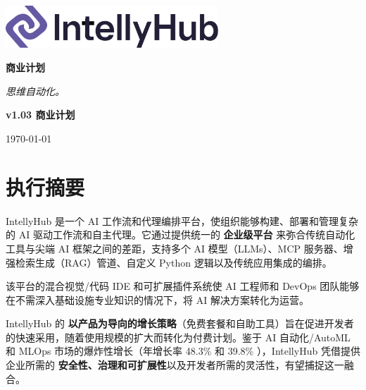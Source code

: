 \documentclass[11pt, a4paper, oneside]{article}
\begin{document}
\thispagestyle{empty} 
\begin{titlepage}
    \centering
    \vspace*{1cm}
    
    \includegraphics[width=0.6\textwidth]{IntellyHub_Logo_Colored.png}
    
    \vspace{2.5cm}
    
    {\Huge\bfseries\color{PrimaryColor}商业计划}
    
    \vspace{1.5cm}
    
    {\Large\itshape\lightfont 思维自动化。}
    
    \vfill %
    
    {\large\bfseries\color{PrimaryColor}v1.03 \color{SecondaryColor}商业计划}
    
    \vspace{0.5cm}
    
    {\large \today}
    
\end{titlepage}

\tableofcontents
\newpage


\section{执行摘要}
IntellyHub 是一个 AI 工作流和代理编排平台，使组织能够构建、部署和管理复杂的 AI 驱动工作流和自主代理。它通过提供统一的 \textbf{企业级平台} 来弥合传统自动化工具与尖端 AI 框架之间的差距，支持多个 AI 模型（LLMs）、MCP 服务器、增强检索生成（RAG）管道、自定义 Python 逻辑以及传统应用集成的编排。

该平台的混合视觉/代码 IDE 和可扩展插件系统使 AI 工程师和 DevOps 团队能够在不需深入基础设施专业知识的情况下，将 AI 解决方案转化为运营。

IntellyHub 的 \textbf{以产品为导向的增长策略}（免费套餐和自助工具）旨在促进开发者的快速采用，随着使用规模的扩大而转化为付费计划。鉴于 AI 自动化/AutoML 和 MLOps 市场的爆炸性增长（年增长率 48.3\% \cite{AIMarket} 和 39.8\% \cite{MLOpsMarket}），IntellyHub 凭借提供企业所需的 \textbf{安全性、治理和可扩展性}以及开发者所需的灵活性，有望捕捉这一融合。
\end{document}
